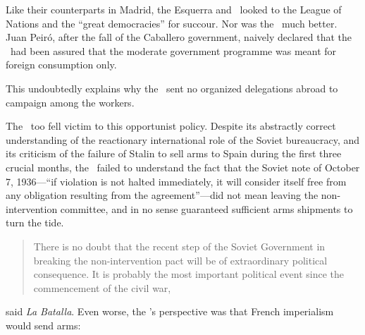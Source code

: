 Like their counterparts in Madrid, the Esquerra and \PSUC\ looked to the League of Nations and the ``great democracies'' for succour. Nor was the \CNT\ much better. Juan Peiró, after the fall of the Caballero government, naively declared that the \CNT\ had been assured that the moderate government programme was meant for foreign consumption only.

This undoubtedly explains why the \CNT\ sent no organized delegations abroad to campaign among the workers.

The \POUM\ too fell victim to this opportunist policy. Despite its abstractly correct understanding of the reactionary international role of the Soviet bureaucracy, and its criticism of the failure of Stalin to sell arms to Spain during the first three crucial months, the \POUM\ failed to understand the fact that the Soviet note of October 7, 1936---``if violation is not halted immediately, it will consider itself free from any obligation resulting from the agreement''---did not mean leaving the non-intervention committee, and in no sense guaranteed sufficient arms shipments to turn the tide.

\begin{quotation}
  There is no doubt that the recent step of the Soviet Government in breaking the non-intervention pact will be of extraordinary political consequence. It is probably the most important political event since the commencement of the civil war,
\end{quotation}
said \emph{La Batalla}. Even worse, the \POUM’s perspective was that French imperialism would send arms:

